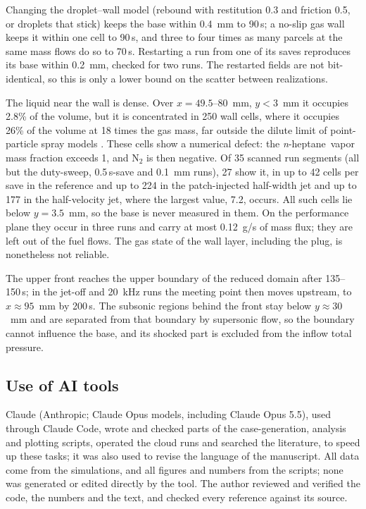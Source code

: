 \documentclass[aip,pof,preprint,amsmath,amssymb]{revtex4-2}
\newcommand{\us}{\,\textmu s}
\newcommand{\nh}{\textit{n}-heptane}
\begin{document}
Changing the droplet--wall model (rebound with restitution 0.3 and friction 0.5, or droplets that stick) keeps the base within 0.4~mm to 90\us; a no-slip gas wall keeps it within one cell to 90\us, and three to four times as many parcels at the same mass flows do so to 70\us. Restarting a run from one of its saves reproduces its base within 0.2~mm, checked for two runs. The restarted fields are not bit-identical, so this is only a lower bound on the scatter between realizations.

The liquid near the wall is dense. Over $x = 49.5$--80~mm, $y < 3$~mm it occupies 2.8\% of the volume, but it is concentrated in 250 wall cells, where it occupies 26\% of the volume at 18 times the gas mass, far outside the dilute limit of point-particle spray models \cite{Elghobashi1994}. These cells show a numerical defect: the \nh\ vapor mass fraction exceeds 1, and N$_2$ is then negative. Of 35 scanned run segments (all but the duty-sweep, 0.5\us-save and 0.1~mm runs), 27 show it, in up to 42 cells per save in the reference and up to 224 in the patch-injected half-width jet and up to 177 in the half-velocity jet, where the largest value, 7.2, occurs. All such cells lie below $y = 3.5$~mm, so the base is never measured in them. On the performance plane they occur in three runs and carry at most 0.12~g/s of mass flux; they are left out of the fuel flows. The gas state of the wall layer, including the plug, is nonetheless not reliable.

The upper front reaches the upper boundary of the reduced domain after 135--150\us; in the jet-off and 20~kHz runs the meeting point then moves upstream, to $x \approx 95$~mm by 200\us. The subsonic regions behind the front stay below $y \approx 30$~mm and are separated from that boundary by supersonic flow, so the boundary cannot influence the base, and its shocked part is excluded from the inflow total pressure.

\subsection{Use of AI tools}\label{sec:ai}

Claude (Anthropic; Claude Opus models, including Claude Opus 5.5), used through Claude Code, wrote and checked parts of the case-generation, analysis and plotting scripts, operated the cloud runs and searched the literature, to speed up these tasks; it was also used to revise the language of the manuscript. All data come from the simulations, and all figures and numbers from the scripts; none was generated or edited directly by the tool. The author reviewed and verified the code, the numbers and the text, and checked every reference against its source.
\end{document}
